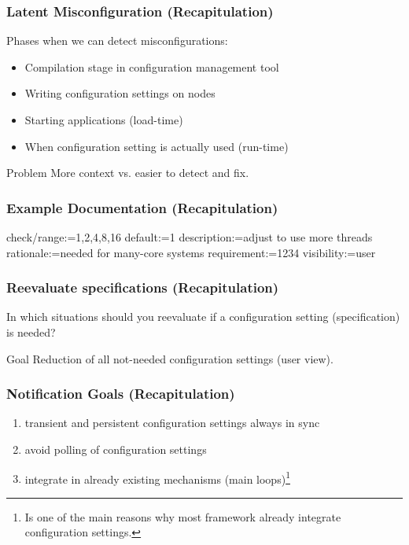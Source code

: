 \begin{frame}
	\frametitle{Latent Misconfiguration (Recapitulation)}
	Phases when we can detect misconfigurations:
	\begin{itemize}[<+-| alert@+>]
	\item Compilation stage in configuration management tool
	\item Writing configuration settings on nodes
	\item Starting applications (load-time)
	\item When configuration setting is actually used (run-time)
	\end{itemize}

	\pause[\thebeamerpauses]

	\begin{alertblock}{Problem}
	More context vs. easier to detect and fix.
	\end{alertblock}
\end{frame}

\begin{frame}[fragile]
	\frametitle{Example Documentation (Recapitulation)}

	\begin{code}
	  check/range:=1,2,4,8,16
	  default:=1
	  description:=adjust to use more threads
	  rationale:=needed for many-core systems
	  requirement:=1234
	  visibility:=user
	\end{code}
\end{frame}

\begin{frame}
	\frametitle{Reevaluate specifications (Recapitulation)}

	In which situations should you reevaluate if a configuration setting (specification) is needed?

	\pause


	\begin{alertblock}{Goal}
	Reduction of all not-needed configuration settings (user view).
	\end{alertblock}
\end{frame}


\begin{frame}
	\frametitle{Notification Goals (Recapitulation)}

	\begin{enumerate}
	\item transient and persistent configuration settings always in sync~\cite{jin2014configurations}
	\item avoid polling of configuration settings
	\item integrate in already existing mechanisms (main loops)\footnote{Is one of the main reasons why most framework already integrate configuration settings.}
	\end{enumerate}

\end{frame}

